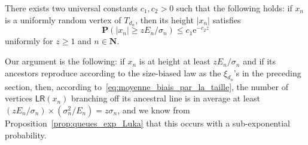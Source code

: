 \documentclass[10pt]{amsart}
\theoremstyle{definition}\newtheorem{defi}[theo]{Definition}\newtheorem{rema}[theo]{Remark}\newtheorem{exam}[theo]{Example}\newtheorem{exem}[theo]{Example}\newtheorem{nota}[theo]{Notation}
\newcommand{\ensembles}[1]{\mathbf{#1}}
\newcommand{\N}{\ensembles{N}}
\renewcommand{\P}{\ensembles{P}}
\renewcommand{\Pr}[1]{\P\left(#1\right)}
\newcommand{\1}{\ensembles{1}}
\renewcommand{\le}{\leqslant}
\renewcommand{\ge}{\geqslant}
\newcommand{\LR}{\mathsf{LR}}
\newcommand{\e}{\mathrm{e}}
\newcommand{\tn}{T_{d_n}}
\newcommand{\edges}{E}
\providecommand{\?}{}
\begin{document}
\begin{prop}\label{prop:queues_exp_hauteur_typique_arbre}
There exists two universal constants $c_1, c_2 > 0$ such that the following holds: if $x_n$ is a uniformly random vertex of $\tn$, then its height $|x_n|$ satisfies
\[
\Pr{|x_n| \ge z \edges_n / \sigma_n} \le c_1 \e^{- c_2 z}
\]
uniformly for $z \ge 1$ and $n \in \N$.
\end{prop}


Our argument is the following: if $x_n$ is at height at least $z \edges_n / \sigma_n$ and if its ancestors reproduce according to the size-biased law as the $\xi_{d_n}$'s in the preceding section, then, according to~\eqref{eq:moyenne_biais_par_la_taille}, the number of vertices $\LR(x_n)$ branching off its ancestral line is in average at least $(z \edges_n / \sigma_n) \times (\sigma_n^2 / \edges_n) = z \sigma_n$, and we know from Proposition~\ref{prop:queues_exp_Luka} that this occurs with a sub-exponential probability.
\end{document}
